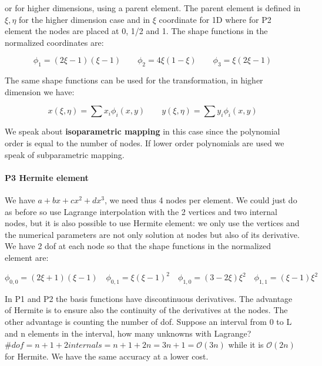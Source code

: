 or for higher dimensions, using a parent element. The parent element is defined in $\xi , \eta$ for the higher dimension case and in $\xi$ coordinate for 1D where for P2 element the nodes are placed at 0, 1/2 and 1. The shape functions in the normalized coordinates are: 

\begin{equation}
\phi _1 = (2\xi - 1)(\xi -1)\qquad \phi _2= 4\xi (1-\xi)\qquad \phi _3 = \xi (2\xi -1)
\end{equation}

The same shape functions can be used for the transformation, in higher dimension we have: 

\begin{equation}
x(\xi , \eta) = \sum x_i\phi _i (x, y) \qquad y(\xi , \eta) = \sum y_i\phi _i (x, y)
\end{equation}

We speak about \textbf{isoparametric mapping} in this case since the polynomial order is equal to the number of nodes. If lower order polynomials are used we speak of subparametric mapping. 

\paragraph{P3 Hermite element}
We have $a + bx + cx^2 + dx^3$, we need thus 4 nodes per element. We could just do as before so use Lagrange interpolation with the 2 vertices and two internal nodes, but it is also possible to use Hermite element: we only use the vertices and the numerical parameters are not only solution at nodes but also of its derivative. We have 2 dof at each node so that the shape functions in the normalized element are: 

\begin{equation}
\phi_{0,0} = (2\xi  + 1)(\xi -1)\quad \phi_{0,1} = \xi (\xi -1)^2\quad \phi_{1,0} = (3-2\xi )\xi^2\quad \phi_{1,1} = (\xi - 1)\xi ^2
\end{equation}

In P1 and P2 the basis functions have discontinuous derivatives. The advantage of Hermite is to ensure also the continuity of the derivatives at the nodes. The other advantage is counting the number of dof. Suppose an interval from 0 to L and n elements in the interval, how many unknowns with Lagrange? $\#dof = n+1 + 2 internals = n+1+ 2n = 3n +1 = \mathcal{O}(3n)$ while it is $\mathcal{O}(2n)$ for Hermite. We have the same accuracy at a lower cost. 

